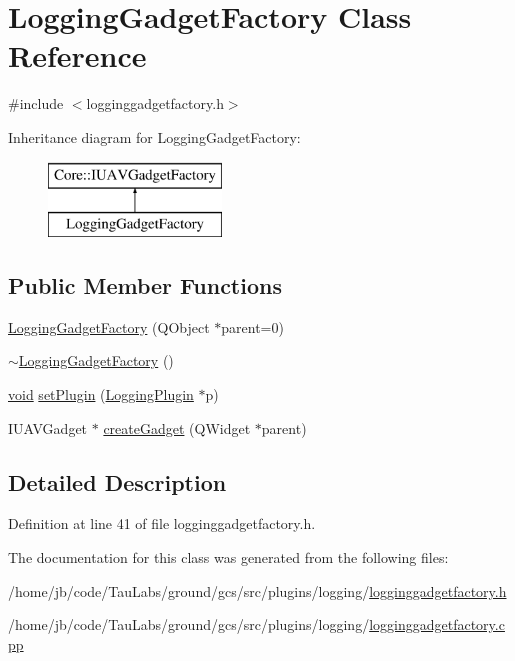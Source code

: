 \hypertarget{class_logging_gadget_factory}{\section{\-Logging\-Gadget\-Factory \-Class \-Reference}
\label{class_logging_gadget_factory}
}


{\ttfamily \#include $<$logginggadgetfactory.\-h$>$}

\-Inheritance diagram for \-Logging\-Gadget\-Factory\-:\begin{figure}[H]
\begin{center}
\leavevmode
\includegraphics[height=2.000000cm]{class_logging_gadget_factory}
\end{center}
\end{figure}
\subsection*{\-Public \-Member \-Functions}
\begin{DoxyCompactItemize}
\item 
\hyperlink{group___g_c_s_control_gadget_plugin_gaef9e98419a7dd5551cd13876c2c4b357}{\-Logging\-Gadget\-Factory} (\-Q\-Object $\ast$parent=0)
\item 
\hyperlink{group___g_c_s_control_gadget_plugin_ga6ddd468f9f7b722281dc55df5d991dc1}{$\sim$\-Logging\-Gadget\-Factory} ()
\item 
\hyperlink{group___u_a_v_objects_plugin_ga444cf2ff3f0ecbe028adce838d373f5c}{void} \hyperlink{group___g_c_s_control_gadget_plugin_ga00c5e0af9d177e7d271c0d6dcd6f4601}{set\-Plugin} (\hyperlink{class_logging_plugin}{\-Logging\-Plugin} $\ast$p)
\item 
\-I\-U\-A\-V\-Gadget $\ast$ \hyperlink{group___g_c_s_control_gadget_plugin_ga95ee0680e9c323e77341bef36195bdf5}{create\-Gadget} (\-Q\-Widget $\ast$parent)
\end{DoxyCompactItemize}


\subsection{\-Detailed \-Description}


\-Definition at line 41 of file logginggadgetfactory.\-h.



\-The documentation for this class was generated from the following files\-:\begin{DoxyCompactItemize}
\item 
/home/jb/code/\-Tau\-Labs/ground/gcs/src/plugins/logging/\hyperlink{logginggadgetfactory_8h}{logginggadgetfactory.\-h}\item 
/home/jb/code/\-Tau\-Labs/ground/gcs/src/plugins/logging/\hyperlink{logginggadgetfactory_8cpp}{logginggadgetfactory.\-cpp}\end{DoxyCompactItemize}
